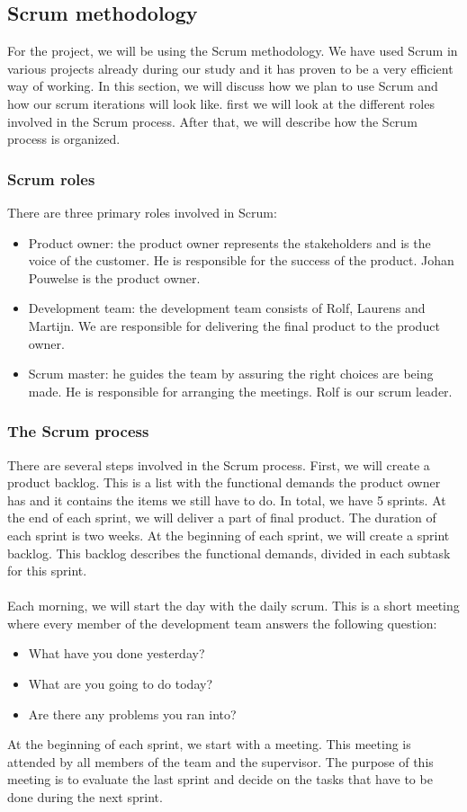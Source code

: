 \documentclass{article}
\begin{document}
\subsection{Scrum methodology}
For the project, we will be using the Scrum methodology. We have used Scrum in various projects already during our study and it has proven to be a very efficient way of working. In this section, we will discuss how we plan to use Scrum and how our scrum iterations will look like. first we will  look at the different roles involved in the Scrum process. After that, we will describe how the Scrum process is organized.

\subsubsection{Scrum roles}
There are three primary roles involved in Scrum:
\begin{itemize}
\item Product owner: the product owner represents the stakeholders and is the voice of the customer. He is responsible for the success of the product. Johan Pouwelse is the product owner.
\item Development team: the development team consists of Rolf, Laurens and Martijn. We are responsible for delivering the final product to the product owner.
\item Scrum master: he guides the team by assuring the right choices are being made. He is responsible for arranging the meetings. Rolf is our scrum leader.
\end{itemize}

\subsubsection{The Scrum process}
There are several steps involved in the Scrum process. First, we will create a product backlog. This is a list with the functional demands the product owner has and it contains the items we still have to do. In total, we have 5 sprints. At the end of each sprint, we will deliver a part of final product. The duration of each sprint is two weeks. At the beginning of each sprint, we will create a sprint backlog. This backlog describes the functional demands, divided in each subtask for this sprint.\\\\
Each morning, we will start the day with the daily scrum. This is a short meeting where every member of the development team answers the following question:
\begin{itemize}
\item What have you done yesterday?
\item What are you going to do today?
\item Are there any problems you ran into?
\end{itemize}
At the beginning of each sprint, we start with a meeting. This meeting is attended by all members of the team and the supervisor. The purpose of this meeting is to evaluate the last sprint and decide on the tasks that have to be done during the next sprint.
\end{document}
